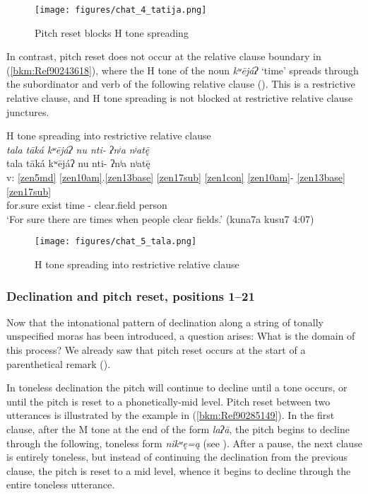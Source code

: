 \documentclass[output=paper]{langscibook}
\begin{document}
\begin{figure}
    \centering
    \texttt{[image: figures/chat\_4\_tatija.png]}
    \caption{Pitch reset blocks H tone spreading}
    \label{fig:chat:key:4}
\end{figure}

In contrast, pitch reset does not occur at the relative clause boundary in (\ref{bkm:Ref90243618}), where the H tone of the noun \textit{kʷējáʔ} `time' spreads through the subordinator and verb of the following relative clause (). This is a restrictive relative clause, and H tone spreading is not blocked at restrictive relative clause junctures.


\ea\label{bkm:Ref90243618}H tone spreading into restrictive relative clause\\ 
\textit{tala tāká kʷējáʔ nu nti- ʔnʲa nʲatę̄} \\ 
\glll {} tala tāká kʷējáʔ nu nti- ʔnʲa nʲatę̄\\
v: \ref{zen5md} \ref{zen10am}.\ref{zen13base} \ref{zen17sub} \ref{zen1con} \ref{zen10am}{}- \ref{zen13base} \ref{zen17sub} \\ 
{} for.sure exist time \Sub{} \Hab{}- clear.field person\\
\glt `For sure there are times when people clear fields.' (kuna7a kusu7 4:07)
\z

\begin{figure}
    \centering
    \texttt{[image: figures/chat\_5\_tala.png]}
    \caption{H tone spreading into restrictive relative clause}
    \label{fig:chat:key:5}
\end{figure}


\subsubsection{Declination and pitch reset, positions 1{}--21}
\label{bkm:Ref90284807}\label{bkm:Ref113308417}
Now that the intonational pattern of declination along a string of tonally unspecified moras has been introduced, a question arises: What is the domain of this process? We already saw that pitch reset occurs at the start of a parenthetical remark ().

In toneless declination the pitch will continue to decline until a tone occurs, or until the pitch is reset to a phonetically-mid level. Pitch reset between two utterances is illustrated by the example in (\ref{bkm:Ref90285149}). In the first clause, after the M tone at the end of the form \textit{laʔā}, the pitch begins to decline through the following, toneless form \textit{nikʷę=ą} (see ). After a pause, the next clause is entirely toneless, but instead of continuing the declination from the previous clause, the pitch is reset to a mid level, whence it begins to decline through the entire toneless utterance.
\end{document}
